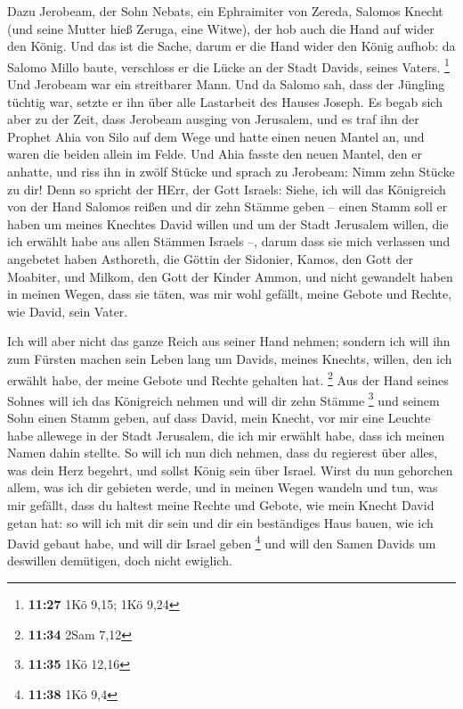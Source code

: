  Dazu Jerobeam, der Sohn Nebats, ein Ephraimiter von
Zereda, Salomos Knecht (und seine Mutter hieß Zeruga, eine Witwe), der
hob auch die Hand auf wider den König.  Und das ist die
Sache, darum er die Hand wider den König aufhob: da Salomo Millo baute,
verschloss er die Lücke an der Stadt Davids, seines Vaters. \footnote{\textbf{11:27}
  1Kö 9,15; 1Kö 9,24}  Und Jerobeam war ein streitbarer
Mann. Und da Salomo sah, dass der Jüngling tüchtig war, setzte er ihn
über alle Lastarbeit des Hauses Joseph.  Es begab sich
aber zu der Zeit, dass Jerobeam ausging von Jerusalem, und es traf ihn
der Prophet Ahia von Silo auf dem Wege und hatte einen neuen Mantel an,
und waren die beiden allein im Felde.  Und Ahia fasste
den neuen Mantel, den er anhatte, und riss ihn in zwölf Stücke
 und sprach zu Jerobeam: Nimm zehn Stücke zu dir! Denn so
spricht der HErr, der Gott Israels: Siehe, ich will das Königreich von
der Hand Salomos reißen und dir zehn Stämme geben -- 
einen Stamm soll er haben um meines Knechtes David willen und um der
Stadt Jerusalem willen, die ich erwählt habe aus allen Stämmen Israels
--,  darum dass sie mich verlassen und angebetet haben
Asthoreth, die Göttin der Sidonier, Kamos, den Gott der Moabiter, und
Milkom, den Gott der Kinder Ammon, und nicht gewandelt haben in meinen
Wegen, dass sie täten, was mir wohl gefällt, meine Gebote und Rechte,
wie David, sein Vater.

 Ich will aber nicht das ganze Reich aus seiner Hand
nehmen; sondern ich will ihn zum Fürsten machen sein Leben lang um
Davids, meines Knechts, willen, den ich erwählt habe, der meine Gebote
und Rechte gehalten hat. \footnote{\textbf{11:34} 2Sam 7,12}
 Aus der Hand seines Sohnes will ich das Königreich
nehmen und will dir zehn Stämme \footnote{\textbf{11:35} 1Kö 12,16}
 und seinem Sohn einen Stamm geben, auf dass David, mein
Knecht, vor mir eine Leuchte habe allewege in der Stadt Jerusalem, die
ich mir erwählt habe, dass ich meinen Namen dahin stellte.
 So will ich nun dich nehmen, dass du regierest über
alles, was dein Herz begehrt, und sollst König sein über Israel.
 Wirst du nun gehorchen allem, was ich dir gebieten
werde, und in meinen Wegen wandeln und tun, was mir gefällt, dass du
haltest meine Rechte und Gebote, wie mein Knecht David getan hat: so
will ich mit dir sein und dir ein beständiges Haus bauen, wie ich David
gebaut habe, und will dir Israel geben \footnote{\textbf{11:38} 1Kö 9,4}
 und will den Samen Davids um deswillen demütigen, doch
nicht ewiglich.

